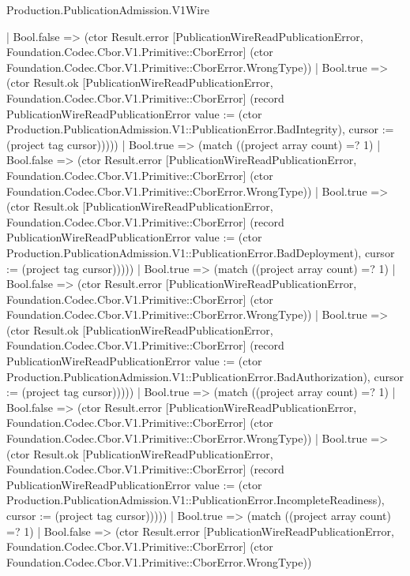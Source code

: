 \begin{lexlean}{Production.PublicationAdmission.V1Wire}
\begin{semanticmodule}
{                                    | Bool.false => (ctor Result.error [PublicationWireReadPublicationError, Foundation.Codec.Cbor.V1.Primitive::CborError] (ctor Foundation.Codec.Cbor.V1.Primitive::CborError.WrongType))
                                    | Bool.true => (ctor Result.ok [PublicationWireReadPublicationError, Foundation.Codec.Cbor.V1.Primitive::CborError] (record PublicationWireReadPublicationError {value := (ctor Production.PublicationAdmission.V1::PublicationError.BadIntegrity), cursor := (project tag cursor)}))))
                                | Bool.true => (match ((project array count) =? 1)
                                  | Bool.false => (ctor Result.error [PublicationWireReadPublicationError, Foundation.Codec.Cbor.V1.Primitive::CborError] (ctor Foundation.Codec.Cbor.V1.Primitive::CborError.WrongType))
                                  | Bool.true => (ctor Result.ok [PublicationWireReadPublicationError, Foundation.Codec.Cbor.V1.Primitive::CborError] (record PublicationWireReadPublicationError {value := (ctor Production.PublicationAdmission.V1::PublicationError.BadDeployment), cursor := (project tag cursor)}))))
                              | Bool.true => (match ((project array count) =? 1)
                                | Bool.false => (ctor Result.error [PublicationWireReadPublicationError, Foundation.Codec.Cbor.V1.Primitive::CborError] (ctor Foundation.Codec.Cbor.V1.Primitive::CborError.WrongType))
                                | Bool.true => (ctor Result.ok [PublicationWireReadPublicationError, Foundation.Codec.Cbor.V1.Primitive::CborError] (record PublicationWireReadPublicationError {value := (ctor Production.PublicationAdmission.V1::PublicationError.BadAuthorization), cursor := (project tag cursor)}))))
                            | Bool.true => (match ((project array count) =? 1)
                              | Bool.false => (ctor Result.error [PublicationWireReadPublicationError, Foundation.Codec.Cbor.V1.Primitive::CborError] (ctor Foundation.Codec.Cbor.V1.Primitive::CborError.WrongType))
                              | Bool.true => (ctor Result.ok [PublicationWireReadPublicationError, Foundation.Codec.Cbor.V1.Primitive::CborError] (record PublicationWireReadPublicationError {value := (ctor Production.PublicationAdmission.V1::PublicationError.IncompleteReadiness), cursor := (project tag cursor)}))))
                          | Bool.true => (match ((project array count) =? 1)
                            | Bool.false => (ctor Result.error [PublicationWireReadPublicationError, Foundation.Codec.Cbor.V1.Primitive::CborError] (ctor Foundation.Codec.Cbor.V1.Primitive::CborError.WrongType))
}
\end{semanticmodule}
\end{lexlean}
